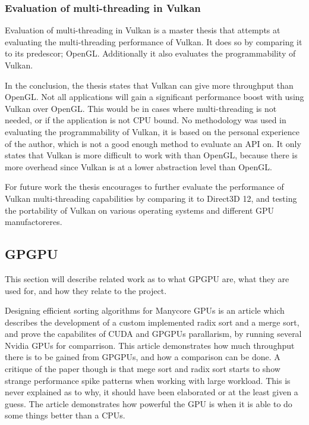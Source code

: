 \subsubsection{Evaluation of multi-threading in Vulkan}

Evaluation of multi-threading in Vulkan \cite{blackert_2016_evaluation} is a master thesis that attempts at evaluating the multi-threading performance of Vulkan. It does so by comparing it to its predescor; OpenGL. 
Additionally it also evaluates the programmability of Vulkan. 

In the conclusion, the thesis states that Vulkan can give more throughput than OpenGL. 
Not all applications will gain a significant performance boost with using Vulkan over OpenGL. 
This would be in cases where multi-threading is not needed, or if the application is not CPU bound. 
No methodology was used in evaluating the programmability of Vulkan, it is based on the personal experience of the author, which is not a good enough method to evaluate an \gls{API} on. 
It only states that Vulkan is more difficult to work with than OpenGL, because there is more overhead since Vulkan is at a lower abstraction level than OpenGL. 

For future work the thesis encourages to further evaluate the performance of Vulkan multi-threading  capabilities by comparing it to Direct3D 12, and testing the portability of Vulkan on various operating systems and different \gls{GPU} manufactoreres.

\subsection{\gls{GPGPU}}
This section will describe related work as to what GP\gls{GPU} are, what they are used for, and how they relate to the project.

Designing efficient sorting algorithms for Manycore \glspl{GPU} \cite{satish_2009_designing} is an article which describes the development of a custom implemented radix sort and a merge sort, and prove the capabilites of CUDA and \glspl{GPGPU} parallarism, by running several Nvidia \glspl{GPU} for comparrison. 
This article demonstrates how much throughput there is to be gained from \glspl{GPGPU}, and how a comparison can be done. 
A critique of the paper though is that mege sort and radix sort starts to show strange performance spike patterns when working with large workload. 
This is never explained as to why, it should have been elaborated or at the least given a guess.
The article demonstrates how powerful the \gls{GPU} is when it is able to do some things better than a \glspl{CPU}.

